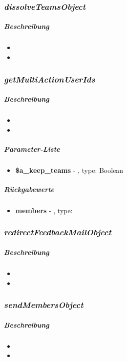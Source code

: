 \subsubsection*{\textit{dissolveTeamsObject}}\label{dissolveTeamsObjectTGUI}
\subparagraph{Beschreibung}
\begin{itemize}
	\item[] \noindent{}
	\item[]  
\end{itemize}

\subsubsection*{\textit{getMultiActionUserIds}}\label{getMultiActionUserIdsTGUI}
\subparagraph{Beschreibung}
\begin{itemize}
	\item[] \noindent{}
	\item[]  
\end{itemize}
\subparagraph{Parameter-Liste}
\begin{itemize}
	\item[] \textbf{\$a\_keep\_teams} - , type: Boolean
\end{itemize}
\subparagraph{Rückgabewerte}
\begin{itemize}
	\item[] \textbf{members} - , type: 
\end{itemize}

\subsubsection*{\textit{redirectFeedbackMailObject}}\label{redirectFeedbackMailObjectTGUI}
\subparagraph{Beschreibung}
\begin{itemize}
	\item[] \noindent{}
	\item[]  
\end{itemize}

\subsubsection*{\textit{sendMembersObject}}\label{sendMembersObjectTGUI}
\subparagraph{Beschreibung}
\begin{itemize}
	\item[] \noindent{}
	\item[]  
\end{itemize}

